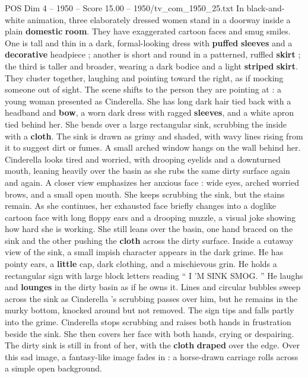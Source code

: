 \begin{textsample}{POS Dim 4 – 1950 – Score 15.00 – 1950/tv\_com\_1950\_25.txt}  \label{ex:f4_pos_035}
In black-and-white animation, three elaborately dressed women stand in a doorway inside a plain \textbf{domestic} \textbf{room}.
They have exaggerated cartoon faces and smug smiles.
One is tall and thin in a dark, formal-looking dress with \textbf{puffed} \textbf{sleeves} and a \textbf{decorative} headpiece ; another is short and round in a patterned, ruffled \textbf{skirt} ; the third is taller and broader, wearing a dark bodice and a light \textbf{striped} \textbf{skirt}.
They cluster together, laughing and pointing toward the right, as if mocking someone out of sight.
The scene shifts to the person they are pointing at : a young woman presented as Cinderella.
She has long dark hair tied back with a headband and \textbf{bow}, a worn dark dress with ragged \textbf{sleeves}, and a white apron tied behind her.
She bends over a large rectangular sink, scrubbing the inside with a \textbf{cloth}.
The sink is drawn as grimy and shaded, with wavy lines rising from it to suggest dirt or fumes.
A small arched window hangs on the wall behind her.
Cinderella looks tired and worried, with drooping eyelids and a downturned mouth, leaning heavily over the basin as she rubs the same dirty surface again and again.
A closer view emphasizes her anxious face : wide eyes, arched worried brows, and a small open mouth.
She keeps scrubbing the sink, but the stains remain.
As she continues, her exhausted face briefly changes into a doglike cartoon face with long floppy ears and a drooping muzzle, a visual joke showing how hard she is working.
She still leans over the basin, one hand braced on the sink and the other pushing the \textbf{cloth} across the dirty surface.
Inside a cutaway view of the sink, a small impish character appears in the dark grime.
He has pointy ears, a \textbf{little} cap, dark clothing, and a mischievous grin.
He holds a rectangular sign with large block letters reading “ I ’M SINK SMOG. ” He laughs and \textbf{lounges} in the dirty basin as if he owns it.
Lines and circular bubbles sweep across the sink as Cinderella ’s scrubbing passes over him, but he remains in the murky bottom, knocked around but not removed.
The sign tips and falls partly into the grime.
Cinderella stops scrubbing and raises both hands in frustration beside the sink.
She then covers her face with both hands, crying or despairing.
The dirty sink is still in front of her, with the \textbf{cloth} \textbf{draped} over the edge.
Over this sad image, a fantasy-like image fades in : a horse-drawn carriage rolls across a simple open background.

\end{textsample}
